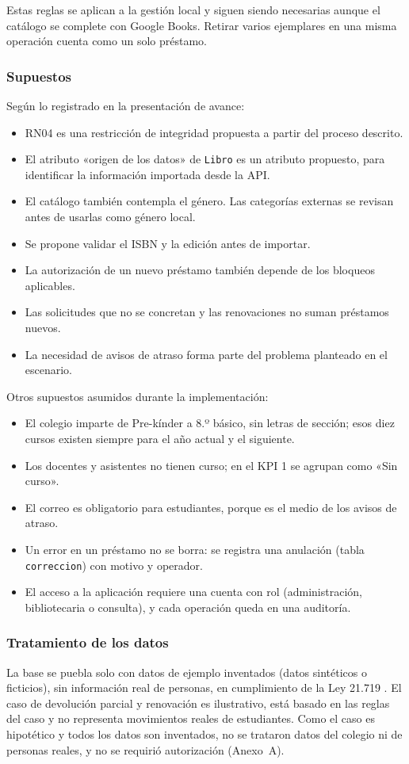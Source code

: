 \documentclass[11pt,a4paper]{article}
\begin{document}
Estas reglas se aplican a la gestión local y siguen siendo necesarias aunque el catálogo se complete con Google Books. Retirar varios ejemplares en una misma operación cuenta como un solo préstamo.

\subsubsection{Supuestos}
Según lo registrado en la presentación de avance:
\begin{itemize}[nosep]
\item RN04 es una restricción de integridad propuesta a partir del proceso descrito.
\item El atributo «origen de los datos» de \texttt{Libro} es un atributo propuesto, para identificar la información importada desde la API.
\item El catálogo también contempla el género. Las categorías externas se revisan antes de usarlas como género local.
\item Se propone validar el ISBN y la edición antes de importar.
\item La autorización de un nuevo préstamo también depende de los bloqueos aplicables.
\item Las solicitudes que no se concretan y las renovaciones no suman préstamos nuevos.
\item La necesidad de avisos de atraso forma parte del problema planteado en el escenario.
\end{itemize}
Otros supuestos asumidos durante la implementación:
\begin{itemize}[nosep]
\item El colegio imparte de Pre-kínder a 8.º básico, sin letras de sección; esos diez cursos existen siempre para el año actual y el siguiente.
\item Los docentes y asistentes no tienen curso; en el KPI 1 se agrupan como «Sin curso».
\item El correo es obligatorio para estudiantes, porque es el medio de los avisos de atraso.
\item Un error en un préstamo no se borra: se registra una anulación (tabla \texttt{correccion}) con motivo y operador.
\item El acceso a la aplicación requiere una cuenta con rol (administración, bibliotecaria o consulta), y cada operación queda en una auditoría.
\end{itemize}

\subsubsection{Tratamiento de los datos}\label{sec:tratamiento}
La base se puebla solo con datos de ejemplo inventados (datos sintéticos o ficticios), sin información real de personas, en cumplimiento de la Ley 21.719 \cite{ley21719}. El caso de devolución parcial y renovación es ilustrativo, está basado en las reglas del caso y no representa movimientos reales de estudiantes. Como el caso es hipotético y todos los datos son inventados, no se trataron datos del colegio ni de personas reales, y no se requirió autorización (Anexo~A).
\end{document}
